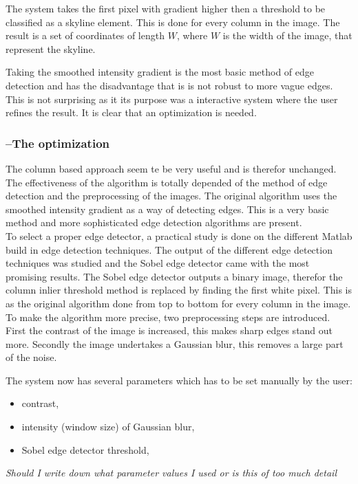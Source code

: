The system takes the first pixel with gradient higher then a threshold to be
classified as a skyline element.  This is done for every column in the image.
The result is a set of coordinates of length $W$,
where $W$ is the width of the image, that represent the skyline.

Taking the smoothed intensity gradient is the most basic method of edge
detection and has the disadvantage that is is not robust to more vague
edges. This is not surprising as it its purpose was a interactive system where the
user refines the result. It is clear that an optimization is needed.

  \subsubsection{--The optimization}
The column based approach seem te be very useful and is therefor unchanged. 
The effectiveness of the algorithm is totally depended of the method of edge
detection and the preprocessing of the images. 
The original algorithm uses the smoothed intensity gradient as a way of
detecting edges. This is a very basic method and more sophisticated edge
detection algorithms are present.\\



To select a proper edge detector, a practical study is done on the different
Matlab build in edge detection techniques. The output of the different edge
detection techniques was studied and the Sobel edge detector came with the most
promising results. The Sobel edge detector outputs a binary image, therefor the column inlier
threshold method is replaced by finding the first white pixel. This is as the
original algorithm done from top to bottom for every column in the image.
\\ 
To make the algorithm more precise, two preprocessing
steps are introduced. First the contrast of the image is increased, this makes
sharp edges stand out more.  Secondly the image undertakes a Gaussian blur,
this removes a large part of the noise.

The system now has several parameters which has to be set manually by the user:
\begin{itemize}
	\item contrast,
	\item intensity (window size) of Gaussian blur,
	\item Sobel edge detector threshold,
\end{itemize}
\textit{Should I write down what parameter values I used or is this of too much
detail}

